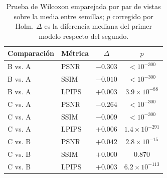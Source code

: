 \begin{table}[t]
\centering
\caption{Prueba de Wilcoxon emparejada por par de vistas sobre la media entre semillas; $p$ corregido por Holm. $\Delta$ es la diferencia mediana del primer modelo respecto del segundo.}
\label{tab:wilcoxon}
\setlength{\tabcolsep}{2pt}
\begin{tabular}{llcc}
\toprule
Comparación & Métrica & $\Delta$ & $p$ \\
\midrule
B vs. A & PSNR & $-0.303$ & $<10^{-300}$ \\
B vs. A & SSIM & $-0.010$ & $<10^{-300}$ \\
B vs. A & LPIPS & $+0.003$ & $3.9\times10^{-88}$ \\
C vs. A & PSNR & $-0.264$ & $<10^{-300}$ \\
C vs. A & SSIM & $-0.009$ & $<10^{-300}$ \\
C vs. A & LPIPS & $+0.006$ & $1.4\times10^{-291}$ \\
C vs. B & PSNR & $+0.042$ & $2.8\times10^{-15}$ \\
C vs. B & SSIM & $+0.000$ & 0.870 \\
C vs. B & LPIPS & $+0.003$ & $6.2\times10^{-113}$ \\
\bottomrule
\end{tabular}
\end{table}
